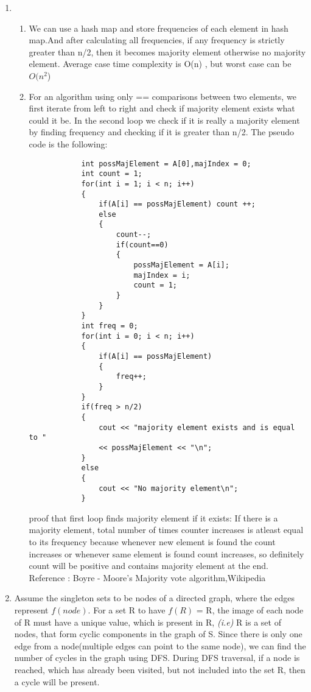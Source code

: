 \documentclass[12pt]{article}
\begin{document}
\begin{enumerate}
    
    \item
    \begin{enumerate}
        \item 
        We can use a hash map and store frequencies of each element in hash map.And after calculating all frequencies, if any frequency is strictly greater than n/2, then it becomes majority element otherwise no majority element.
        Average case time complexity is O(n) , but worst case can be $O(n^2$)
        \item
        For an algorithm using only == comparisons between two elements, we first iterate from left to right and check if majority element exists what could it be.
        In the second loop we check if it is really a majority element by finding frequency and checking if it is greater than n/2.
        The pseudo code is the following:
        \begin{verbatim}
            int possMajElement = A[0],majIndex = 0;
            int count = 1;
            for(int i = 1; i < n; i++)
            {
                if(A[i] == possMajElement) count ++;
                else
                {
                    count--;
                    if(count==0)
                    {
                        possMajElement = A[i];
                        majIndex = i;
                        count = 1;
                    }
                }
            }
            int freq = 0;
            for(int i = 0; i < n; i++)
            {
                if(A[i] == possMajElement)
                {
                    freq++;
                }
            }
            if(freq > n/2)
            {
                cout << "majority element exists and is equal to " 
                << possMajElement << "\n";
            }
            else
            {
                cout << "No majority element\n";
            }
        \end{verbatim}
        proof that first loop finds majority element if it exists:
        If there is a majority element, total number of times counter increases is atleast equal to its frequency because whenever new element is found the count increases or whenever same element is found count increases, so definitely count will be positive and contains majority element at the end.
        Reference : Boyre - Moore's Majority vote algorithm,Wikipedia
    \end{enumerate}
    \item Assume the singleton sets to be nodes of a directed graph, where the edges represent $f(node)$. For a set R to have $f(R)$ = R, the image of each node of R must have a unique value, which is present in R, \textit{(i.e)} R is a set of nodes, that form cyclic components in the graph of S. Since there is only one edge from a node(multiple edges can point to the same node), we can find the number of cycles in the graph using DFS. During DFS traversal, if a node is reached, which has already been visited, but not included into the set R, then a cycle will be present.
    

\end{enumerate}
\end{document}
